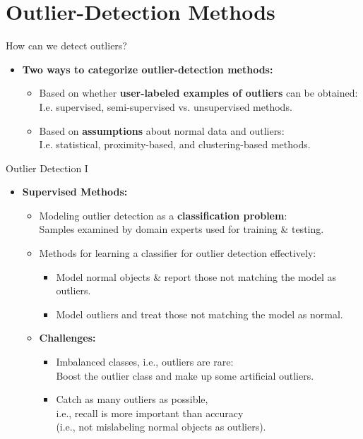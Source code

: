 \section{Outlier-Detection Methods}

\begin{frame}{How can we detect outliers?}
	\begin{itemize}
		\item \textbf{Two ways to categorize outlier-detection methods:}
		      \begin{itemize}
			      \item Based on whether \textbf{\color{airforceblue}user-labeled examples of outliers} can be obtained: \\
			            I.e. supervised, semi-supervised vs. unsupervised methods.
			      \item Based on \textbf{\color{airforceblue}assumptions} about normal data and outliers: \\
			            I.e. statistical, proximity-based, and clustering-based methods.
		      \end{itemize}
	\end{itemize}
\end{frame}


\begin{frame}{Outlier Detection I}
	\begin{itemize}
		\item \textbf{Supervised Methods:}
		      \begin{itemize}
			      \item Modeling outlier detection as a \textbf{classification problem}:\\
			            Samples examined by domain experts used for training \& testing.
			      \item Methods for learning a classifier for outlier detection effectively:
			            \begin{itemize}
				            \item Model normal objects \& report those not matching the model as outliers.
				            \item Model outliers and treat those not matching the model as normal.
			            \end{itemize}
			      \item \textbf{Challenges:}
			            \begin{itemize}
				            \item Imbalanced classes, i.e., outliers are rare: \\
				                  Boost the outlier class and make up some artificial outliers.
				            \item Catch as many outliers as possible, \\
				                  i.e., recall is more important than accuracy \\
				                  (i.e., not mislabeling normal objects as outliers).
			            \end{itemize}
		      \end{itemize}
	\end{itemize}
\end{frame}


